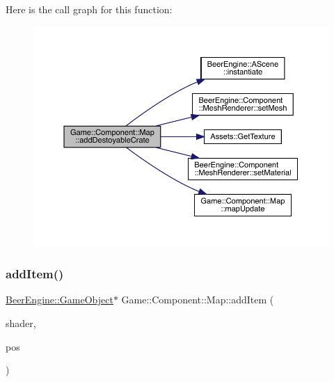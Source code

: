 Here is the call graph for this function\+:
\nopagebreak
\begin{figure}[H]
\begin{center}
\leavevmode
\includegraphics[width=350pt]{class_game_1_1_component_1_1_map_ab7d5bd531fc73fa3c4697e6d7fd909f2_cgraph}
\end{center}
\end{figure}
\mbox{\label{class_game_1_1_component_1_1_map_ace1a6fc80c32206aea8ffc382a30e879}} 
\subsubsection{\texorpdfstring{add\+Item()}{addItem()}}
{\footnotesize\ttfamily \mbox{\hyperlink{class_beer_engine_1_1_game_object}{Beer\+Engine\+::\+Game\+Object}}$\ast$ Game\+::\+Component\+::\+Map\+::add\+Item (\begin{DoxyParamCaption}\item[{\mbox{\hyperlink{class_beer_engine_1_1_graphics_1_1_shader_program}{Beer\+Engine\+::\+Graphics\+::\+Shader\+Program}} $\ast$}]{shader,  }\item[{glm\+::vec3}]{pos }\end{DoxyParamCaption})}

\mbox{\label{class_game_1_1_component_1_1_map_a58dde006ce5b554a6ac63dc59bb480e1}} 

